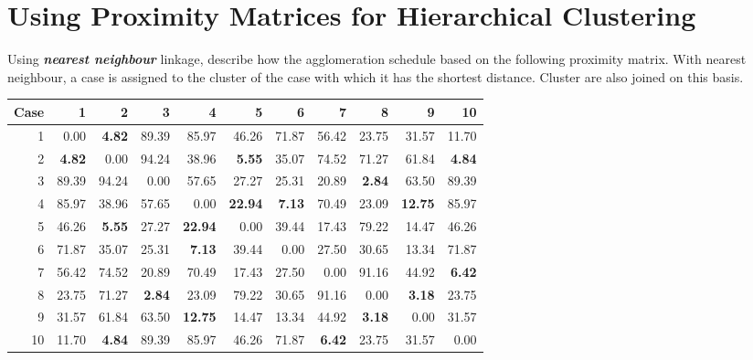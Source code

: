 \documentclass[a4paper,12pt]{report}
\begin{document}
\newpage
\section{Using Proximity Matrices for Hierarchical Clustering}

Using \textbf{\textit{nearest neighbour}} linkage, describe how the agglomeration schedule based on the following 
proximity matrix. With nearest neighbour, a case is assigned to the cluster of the case with which it has the shortest distance. Cluster are also joined on this basis.


\begin{table}[ht]
	\centering
	\begin{tabular}{|r|rrrrrrrrrr|}
		\hline
		Case & 1 & 2 & 3 & 4 & 5 & 6 & 7 & 8 & 9 & 10 \\
		\hline
		1 & 0.00 & \textbf{4.82} & 89.39 & 85.97 & 46.26 & 71.87 & 56.42 & 23.75 & 31.57 & 11.70 \\
		2 & \textbf{4.82} & 0.00 & 94.24 & 38.96 & \textbf{5.55} & 35.07 & 74.52 & 71.27 & 61.84 & \textbf{4.84} \\
		3 & 89.39 & 94.24 & 0.00 & 57.65 & 27.27 & 25.31 & 20.89 & \textbf{2.84} & 63.50 & 89.39 \\
		4 & 85.97 & 38.96 & 57.65 & 0.00 & \textbf{22.94} & \textbf{7.13} & 70.49 & 23.09 & \textbf{12.75} & 85.97 \\
		5 & 46.26 & \textbf{5.55} & 27.27 & \textbf{22.94} & 0.00 & 39.44 & 17.43 & 79.22 & 14.47 & 46.26 \\
		6 & 71.87 & 35.07 & 25.31 & \textbf{7.13} & 39.44 & 0.00 & 27.50 & 30.65 & 13.34 & 71.87 \\
		7 & 56.42 & 74.52 & 20.89 & 70.49 & 17.43 & 27.50 & 0.00 & 91.16 & 44.92 & \textbf{6.42} \\
		8 & 23.75 & 71.27 & \textbf{2.84} & 23.09 & 79.22 & 30.65 & 91.16 & 0.00 & \textbf{3.18} & 23.75 \\
		9 & 31.57 & 61.84 & 63.50 & \textbf{12.75} & 14.47 & 13.34 & 44.92 & \textbf{3.18} & 0.00 & 31.57 \\
		10 & 11.70 & \textbf{4.84} & 89.39 & 85.97 & 46.26 & 71.87 & \textbf{6.42} & 23.75 & 31.57 & 0.00 \\
		\hline
	\end{tabular}
\end{table}
\end{document}
